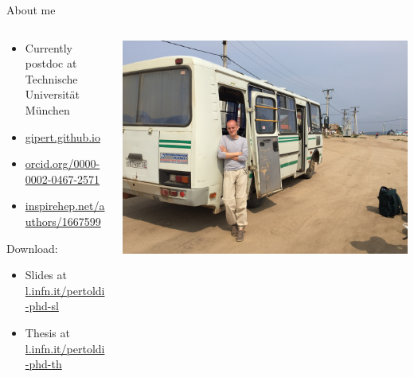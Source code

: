 \documentclass[10pt,aspectratio=169]{beamer}
\institute{Universit\`a degli Studi di Padova / INFN Padova}
\title{\mytitle}
\date{\place\ \sep\ \mydate}
\author{\people}
\begin{document}
\maketitle
\begin{frame}[label=compile]{About me}
  \begin{columns}
    \begin{column}{0.45\textwidth}
      \begin{itemize}
        \item Currently postdoc at Technische Universit\"at M\"unchen
        \item \href{https://gipert.github.io}{gipert.github.io}
        \item \href{https://orcid.org/0000-0002-0467-2571}{orcid.org/0000-0002-0467-2571}
        \item \href{https://inspirehep.net/authors/1667599}{inspirehep.net/authors/1667599}
      \end{itemize}\vspace{16pt}

      {\footnotesize
        Download:
        \begin{itemize}
          \item Slides at \href{https://l.infn.it/pertoldi-phd-sl}{l.infn.it/pertoldi-phd-sl}
          \item Thesis at \href{https://l.infn.it/pertoldi-phd-th}{l.infn.it/pertoldi-phd-th}
        \end{itemize}
      }
    \end{column}
    \begin{column}{0.55\textwidth}
      \vspace*{5mm}
      \includegraphics[trim=0 0 0 0,clip,width=\columnwidth]{me-siberia.jpg}
    \end{column}
  \end{columns}
\end{frame}
\end{document}
